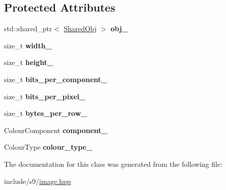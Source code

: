 \subsection*{\-Protected \-Attributes}
\begin{DoxyCompactItemize}
\item 
\hypertarget{classs9_1_1Image_ad7fd39badfa7de65327282ee8967a1f4}{std\-::shared\-\_\-ptr$<$ \hyperlink{structs9_1_1Image_1_1SharedObj}{\-Shared\-Obj} $>$ {\bfseries obj\-\_\-}}\label{classs9_1_1Image_ad7fd39badfa7de65327282ee8967a1f4}

\item 
\hypertarget{classs9_1_1Image_a3daf79df2c18728af8c20027d1f975ea}{size\-\_\-t {\bfseries width\-\_\-}}\label{classs9_1_1Image_a3daf79df2c18728af8c20027d1f975ea}

\item 
\hypertarget{classs9_1_1Image_aeccf42f901665ac318f94724e8d957cb}{size\-\_\-t {\bfseries height\-\_\-}}\label{classs9_1_1Image_aeccf42f901665ac318f94724e8d957cb}

\item 
\hypertarget{classs9_1_1Image_ac520093e8730e13c29566bbdf6053da4}{size\-\_\-t {\bfseries bits\-\_\-per\-\_\-component\-\_\-}}\label{classs9_1_1Image_ac520093e8730e13c29566bbdf6053da4}

\item 
\hypertarget{classs9_1_1Image_a63b8344df6cf2a31480f3e2efa0a36f7}{size\-\_\-t {\bfseries bits\-\_\-per\-\_\-pixel\-\_\-}}\label{classs9_1_1Image_a63b8344df6cf2a31480f3e2efa0a36f7}

\item 
\hypertarget{classs9_1_1Image_a72fbed37956796f45b7a5f3983f14c33}{size\-\_\-t {\bfseries bytes\-\_\-per\-\_\-row\-\_\-}}\label{classs9_1_1Image_a72fbed37956796f45b7a5f3983f14c33}

\item 
\hypertarget{classs9_1_1Image_abb58fd4298e606f2e0e8a769fda3a627}{\-Colour\-Component {\bfseries component\-\_\-}}\label{classs9_1_1Image_abb58fd4298e606f2e0e8a769fda3a627}

\item 
\hypertarget{classs9_1_1Image_a38a9158ee0dbabaee5b30429b35c9685}{\-Colour\-Type {\bfseries colour\-\_\-type\-\_\-}}\label{classs9_1_1Image_a38a9158ee0dbabaee5b30429b35c9685}

\end{DoxyCompactItemize}


\-The documentation for this class was generated from the following file\-:\begin{DoxyCompactItemize}
\item 
include/s9/\hyperlink{image_8hpp}{image.\-hpp}\end{DoxyCompactItemize}
